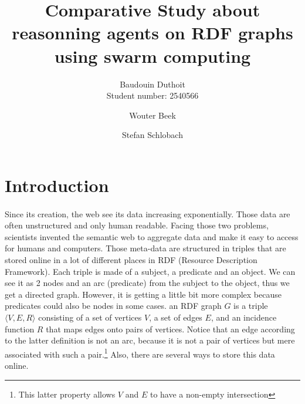 \documentclass{article}
\begin{document}
\title{Comparative Study about reasonning agents on RDF graphs using swarm computing}
\author{Baudouin Duthoit\\
Student number: 2540566
\and
Wouter Beek
\and
Stefan Schlobach
}
\maketitle


\newpage

\tableofcontents

\newpage

\section{Introduction}
	\paragraph{} %
		Since its creation, the web see its data increasing exponentially.
		Those data are often unstructured and only human readable.
		Facing those two problems, scientists invented the semantic web to aggregate data
		and make it easy to access for humans and computers.\cite{Grigoris12}
		Those meta-data are structured in triples that are stored online in a lot of different places in RDF
		(Resource Description Framework).
		Each triple is made of a subject, a predicate and an object.
		We can see it as 2 nodes and an arc (predicate) from the subject to the object, thus we get a directed graph.
		However, it is getting a little bit more complex because predicates could also be nodes in some cases.
		an RDF graph $G$ is a triple $\langle V, E, R \rangle$ consisting of a set of vertices $V$, a set of edges $E$,
		and an incidence function $R$ that maps edges onto pairs of vertices.
		Notice that an edge according to the latter definition is not an arc,
		because it is not a pair of vertices but mere associated with such a pair.\footnote{
			This latter property allows $V$ and $E$ to have a non-empty intersection
		}
		Also, there are several ways to store this data online.
\end{document}
